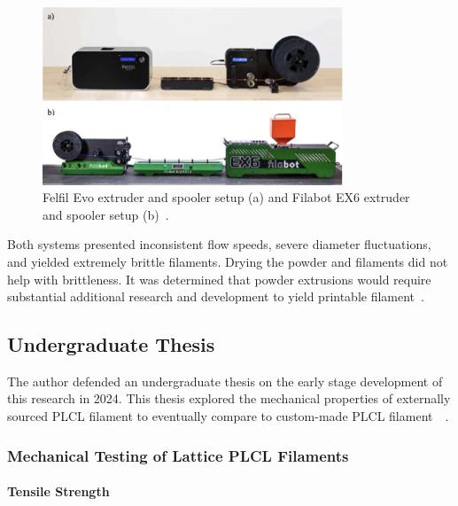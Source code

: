 \begin{figure}[h!]
        \centering
        \includegraphics[width=0.8\textwidth]{../figs/introduction/felfil_and_filabot_extruders.png}
        \caption{Felfil Evo extruder and spooler setup (a) and Filabot EX6 extruder and spooler setup (b)~\cite{RefWorks:RefID:371-bakhtardesign}.}
        \label{fig:introduction:felfilAndFilabotExtruders}
\end{figure}

Both systems presented inconsistent flow speeds, severe diameter fluctuations, and yielded extremely brittle filaments. Drying the powder and filaments did not help with brittleness. It was determined that powder extrusions would require substantial additional research and development to yield printable filament~\cite{RefWorks:RefID:371-bakhtardesign}.

\subsection{Undergraduate Thesis\label{sec:introduction:priorWork:undergradThesis}}
The author defended an undergraduate thesis on the early stage development of this research in 2024. This thesis explored the mechanical properties of externally sourced PLCL filament to eventually compare to custom-made PLCL filament~\cite{RefWorks:RefID:370-einsteinisaac}~\cite{RefWorks:RefID:42-latticemedical}.

\subsubsection{Mechanical Testing of Lattice PLCL Filaments\label{sec:introduction:priorWork:undergradThesis:mechTesting}}

\paragraph*{Tensile Strength\label{sec:introduction:priorWork:undergradThesis:mechTesting:tensileStrength}}

